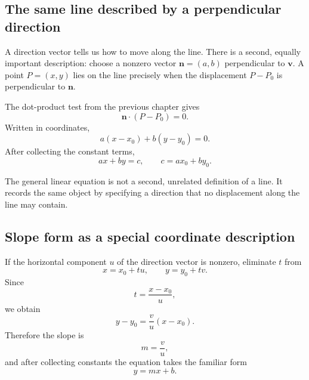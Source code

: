 \subsection{The same line described by a perpendicular direction}

A direction vector tells us how to move along the line. There is a second,
equally important description: choose a nonzero vector $\mathbf n=(a,b)$
perpendicular to $\mathbf v$. A point $P=(x,y)$ lies on the line precisely when
the displacement $P-P_0$ is perpendicular to $\mathbf n$.

\begin{derivationbox}
The dot-product test from the previous chapter gives
\[
\mathbf n\cdot(P-P_0)=0.
\]
Written in coordinates,
\[
a(x-x_0)+b(y-y_0)=0.
\]
After collecting the constant terms,
\[
\boxed{ax+by=c},
\qquad c=ax_0+by_0.
\]
\end{derivationbox}

\begin{interpretationbox}
The general linear equation is not a second, unrelated definition of a line. It
records the same object by specifying a direction that no displacement along the
line may contain.
\end{interpretationbox}

\begin{center}
\end{center}

\subsection{Slope form as a special coordinate description}

\begin{derivationbox}
If the horizontal component $u$ of the direction vector is nonzero, eliminate
$t$ from
\[
x=x_0+tu,
\qquad
y=y_0+tv.
\]
Since
\[
t=\frac{x-x_0}{u},
\]
we obtain
\[
y-y_0=\frac vu(x-x_0).
\]
Therefore the slope is
\[
\boxed{m=\frac vu},
\]
and after collecting constants the equation takes the familiar form
\[
y=mx+b.
\]
\end{derivationbox}

